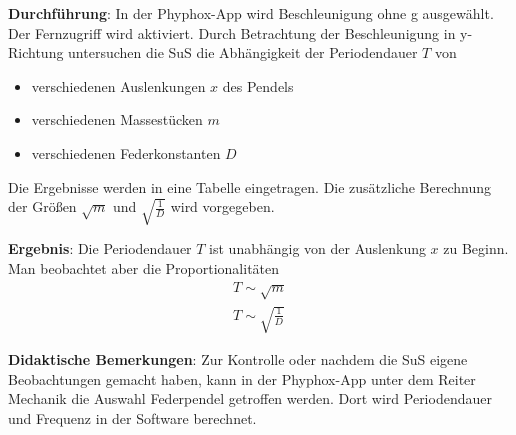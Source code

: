 \documentclass[../main.tex]{subfiles}
\begin{document}
\begin{tcolorbox}
    \vspace{0.5cm}
    \textbf{Durchführung}: In der Phyphox-App wird \glqq Beschleunigung ohne g\grqq{} ausgewählt. Der Fernzugriff wird aktiviert. Durch Betrachtung der Beschleunigung in y-Richtung untersuchen die SuS die Abhängigkeit der Periodendauer $T$ von
    \begin{itemize}[noitemsep]
        \item verschiedenen Auslenkungen $x$ des Pendels
        \item verschiedenen Massestücken $m$
        \item verschiedenen Federkonstanten $D$
    \end{itemize}
    Die Ergebnisse werden in eine Tabelle eingetragen. Die zusätzliche Berechnung der Größen $\sqrt{m}$ und $\sqrt{\frac{1}{D}}$ wird vorgegeben.

    \vspace{0.5cm}
    \textbf{Ergebnis}: Die Periodendauer $T$ ist unabhängig von der Auslenkung $x$ zu Beginn. Man beobachtet aber die Proportionalitäten
    \begin{align*}
        T \sim \sqrt{m} \\
        T \sim \sqrt{\frac{1}{D}}
    \end{align*}
    
    \vspace{0.5cm}
    \textbf{Didaktische Bemerkungen}: Zur Kontrolle oder nachdem die SuS eigene Beobachtungen gemacht haben, kann in der Phyphox-App unter dem Reiter \glqq Mechanik\grqq{} die Auswahl \glqq Federpendel\grqq{} getroffen werden. Dort wird Periodendauer und Frequenz in der Software berechnet.   
     
\end{tcolorbox}
\end{document}
